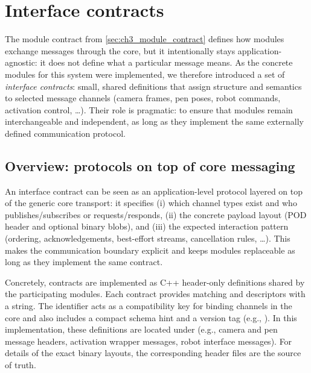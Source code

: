 \section{Interface contracts} \label{sec:ch3_interface_contracts}

The module contract from \autoref{sec:ch3_module_contract} defines how modules exchange messages through the core, but it intentionally stays application-agnostic: it does not define what a particular message means. As the concrete modules for this system were implemented, we therefore introduced a set of \emph{interface contracts}: small, shared definitions that assign structure and semantics to selected message channels (camera frames, pen poses, robot commands, activation control, \dots). Their role is pragmatic: to ensure that modules remain interchangeable and independent, as long as they implement the same externally defined communication protocol.

\subsection{Overview: protocols on top of core messaging} \label{subsec:ch3_interface_contracts_overview}

An interface contract can be seen as an application-level protocol layered on top of the generic core transport:
it specifies (i) which channel types exist and who publishes/subscribes or requests/responds, (ii) the concrete payload layout (POD header and optional binary blobs), and (iii) the expected interaction pattern (ordering, acknowledgements, best-effort streams, cancellation rules, \dots).
This makes the communication boundary explicit and keeps modules replaceable as long as they implement the same contract.

Concretely, contracts are implemented as C++ header-only definitions shared by the participating modules. Each contract provides matching  and  descriptors with a  string. The identifier acts as a compatibility key for binding channels in the core and also includes a compact schema hint and a version tag (e.g., ). In this implementation, these definitions are located under  (e.g., camera and pen message headers, activation wrapper messages, robot interface messages). For details of the exact binary layouts, the corresponding header files are the source of truth.


